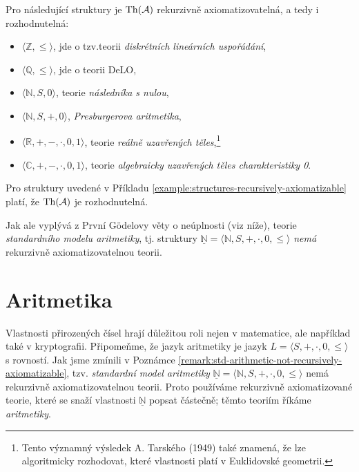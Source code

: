 \begin{example}\label{example:structures-recursively-axiomatizable}
Pro následující struktury je $\operatorname{Th}(\mathcal{A})$ rekurzivně axiomatizovatelná, a tedy i rozhodnutelná:

\begin{itemize}
    \item $\langle\mathbb Z,\leq\rangle$, jde o tzv.teorii \emph{diskrétních lineárních uspořádání},        
    \item $\langle\mathbb Q,\leq\rangle$, jde o teorii DeLO,
    \item $\langle\mathbb N,S,0\rangle$, teorie \emph{následníka s nulou},
    \item $\langle\mathbb N,S,+,0\rangle$, \emph{Presburgerova aritmetika},
    \item $\langle\mathbb R,+,-,\cdot,0,1\rangle$, teorie \emph{reálně uzavřených těles},\footnote{Tento významný výsledek A. Tarského (1949) také znamená, že lze algoritmicky rozhodovat, které vlastnosti platí v Euklidovské geometrii.}
    \item $\langle \mathbb C,+,-,\cdot,0,1 \rangle$, teorie \emph{algebraicky uzavřených těles charakteristiky 0}.
\end{itemize}
\end{example}
   
\begin{corollary}
    Pro struktury uvedené v Příkladu \ref{example:structures-recursively-axiomatizable} platí, že $\operatorname{Th}(\mathcal{A})$ je rozhodnutelná.
\end{corollary}


\begin{remark}\label{remark:std-arithmetic-not-recursively-axiomatizable}
    Jak ale vyplývá z První Gödelovy věty o neúplnosti (viz níže), teorie \emph{standardního modelu aritmetiky}, tj. struktury $\underline{\mathbb N}=\langle\mathbb N,S,+,\cdot,0,\leq\rangle$ \emph{nemá} rekurzivně axiomatizovatelnou teorii.
\end{remark}


\section{Aritmetika}

Vlastnosti přirozených čísel hrají důležitou roli nejen v matematice, ale například také v kryptografii. Připomeňme, že jazyk aritmetiky je jazyk $L=\langle S,+,\cdot,0,\leq\rangle$ s rovností. Jak jsme zmínili v Poznámce \ref{remark:std-arithmetic-not-recursively-axiomatizable}, tzv. \emph{standardní model aritmetiky} $\underline{\mathbb N}=\langle\mathbb N,S,+,\cdot,0,\leq\rangle$ nemá rekurzivně axiomatizovatelnou teorii. Proto používáme rekurzivně axiomatizované teorie, které se snaží vlastnosti $\underline{\mathbb N}$ popsat částečně; těmto teoriím říkáme \emph{aritmetiky}.

